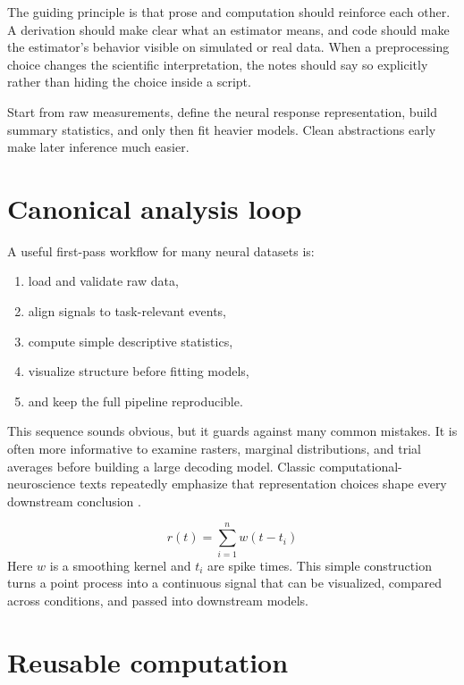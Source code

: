 The guiding principle is that prose and computation should reinforce each other. A derivation should make clear what an estimator means, and code should make the estimator's behavior visible on simulated or real data. When a preprocessing choice changes the scientific interpretation, the notes should say so explicitly rather than hiding the choice inside a script.

\begin{aside}
Start from raw measurements, define the neural response representation, build summary statistics, and only then fit heavier models. Clean abstractions early make later inference much easier.
\end{aside}

\section{Canonical analysis loop}

A useful first-pass workflow for many neural datasets is:
\begin{enumerate}
  \item load and validate raw data,
  \item align signals to task-relevant events,
  \item compute simple descriptive statistics,
  \item visualize structure before fitting models,
  \item and keep the full pipeline reproducible.
\end{enumerate}

This sequence sounds obvious, but it guards against many common mistakes. It is often more informative to examine rasters, marginal distributions, and trial averages before building a large decoding model. Classic computational-neuroscience texts repeatedly emphasize that representation choices shape every downstream conclusion \parencite{dayan2001theoretical,gerstner2014neuronal,paninski2007statistical}.

\begin{keyequation}
\[
r(t) = \sum_{i=1}^{n} w(t-t_i)
\]
\tcblower
Here $w$ is a smoothing kernel and $t_i$ are spike times. This simple construction turns a point process into a continuous signal that can be visualized, compared across conditions, and passed into downstream models.
\end{keyequation}

\section{Reusable computation}


